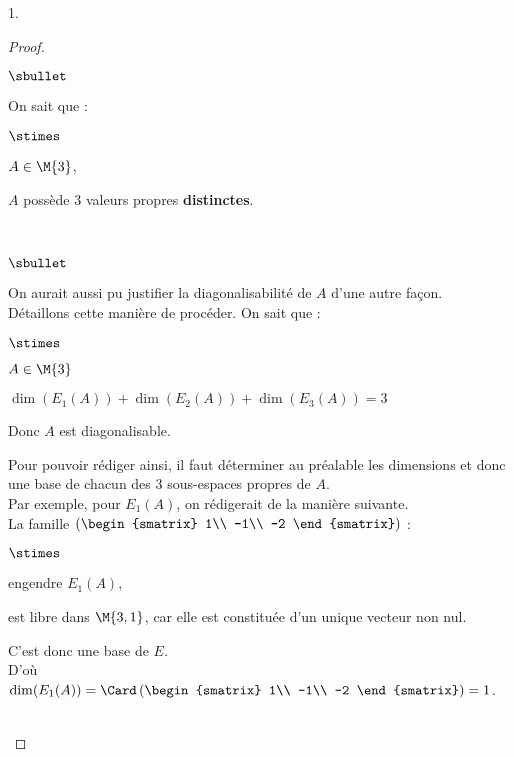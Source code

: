 \documentclass[11pt]{article}%
\begin{document}
\begin{noliste}{1.}
\begin{proof}
\begin{noliste}{$\sbullet$}
 \item On sait que :
  \begin{noliste}{$\stimes$}
    \item $A\in \M{3}$,
    \item $A$ possède $3$ valeurs propres {\bf distinctes}.
  \end{noliste}
  ~\\[-1cm]
 \end{noliste}
  \begin{remark}
    \begin{noliste}{$\sbullet$}
    \item On aurait aussi pu justifier la diagonalisabilité de $A$
      d'une autre façon.\\
      Détaillons cette manière de procéder. On sait que :
      \begin{noliste}{$\stimes$}
      \item $A\in\M{3}$
      \item $\dim(E_1(A))+\dim(E_2(A))+\dim(E_3(A))=3$
      \end{noliste}
      Donc $A$ est diagonalisable.
    \item Pour pouvoir rédiger ainsi, il faut déterminer au préalable
      les dimensions et donc une base de chacun des $3$ sous-espaces
      propres de $A$.\\
      Par exemple, pour $E_1(A)$, on rédigerait de la manière
      suivante.\\
      La famille $\left(
        \begin{smatrix}
          1\\
          -1\\
          -2
        \end{smatrix}\right)$ :
      \begin{noliste}{$\stimes$}
      \item engendre $E_1(A)$,
      \item est libre dans $\M{3,1}$, car elle est constituée d'un
        unique vecteur non nul.
      \end{noliste}
      C'est donc une base de $E$.\\
      D'où $\dim(E_1(A))=\Card\left(
        \begin{smatrix}
          1\\
          -1\\
          -2
        \end{smatrix}
      \right)=1$.
    \end{noliste}
  \end{remark}~\\[-1.4cm]
 \end{proof}
 

\end{noliste}
\end{document}
